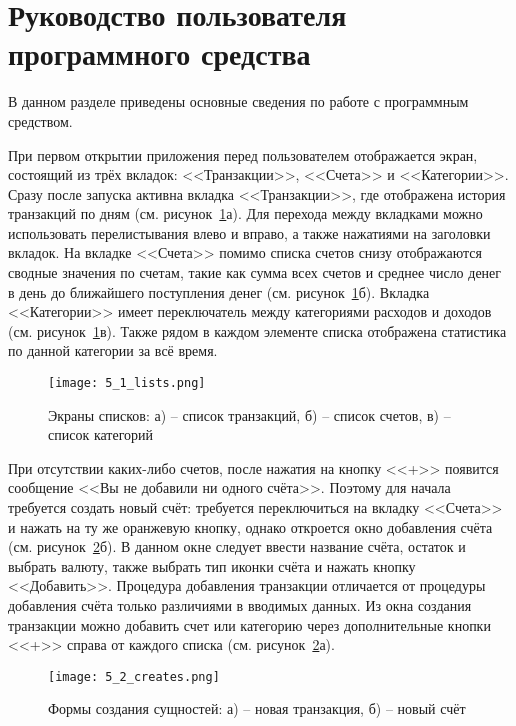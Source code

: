 \section{Руководство пользователя программного средства}
\label{sec:manual}

В данном разделе приведены основные сведения по работе с программным средством.

При первом открытии приложения перед пользователем отображается экран, состоящий из трёх вкладок: <<Транзакции>>, <<Счета>> и <<Категории>>.
Сразу после запуска активна вкладка <<Транзакции>>, где отображена история транзакций по дням (см. рисунок~\ref{fig:manual:lists}а).
Для перехода между вкладками можно использовать перелистывания влево и вправо, а также нажатиями на заголовки вкладок.
На вкладке <<Счета>> помимо списка счетов снизу отображаются сводные значения по счетам, такие как сумма всех счетов и среднее число денег в день до ближайшего поступления денег (см. рисунок~\ref{fig:manual:lists}б).
Вкладка <<Категории>> имеет переключатель между категориями расходов и доходов (см. рисунок~\ref{fig:manual:lists}в).
Также рядом в каждом элементе списка отображена статистика по данной категории за всё время.

\begin{figure}[H]
    \centering
    \texttt{[image: 5\_1\_lists.png]}
    \caption{Экраны списков: а) -- список транзакций, б) -- список счетов, в) -- список категорий}
    \label{fig:manual:lists}
\end{figure}

При отсутствии каких-либо счетов, после нажатия на кнопку <<+>> появится сообщение <<Вы не добавили ни одного счёта>>.
Поэтому для начала требуется создать новый счёт: требуется переключиться на вкладку <<Счета>> и нажать на ту же оранжевую кнопку, однако откроется окно добавления счёта (см. рисунок~\ref{fig:manual:creates}б).
В данном окне следует ввести название счёта, остаток и выбрать валюту, также выбрать тип иконки счёта и нажать кнопку <<Добавить>>.
Процедура добавления транзакции отличается от процедуры добавления счёта только различиями в вводимых данных.
Из окна создания транзакции можно добавить счет или категорию через дополнительные кнопки <<+>> справа от каждого списка (см. рисунок~\ref{fig:manual:creates}а).

\begin{figure}[H]
    \centering
    \texttt{[image: 5\_2\_creates.png]}
    \caption{Формы создания сущностей: а) -- новая транзакция, б) -- новый счёт}
    \label{fig:manual:creates}
\end{figure}

